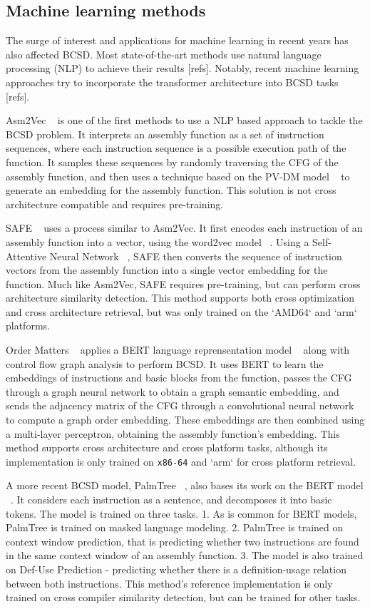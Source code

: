 \documentclass[conference,compsoc]{IEEEtran}
\begin{document}
\subsection{Machine learning methods}

The surge of interest and applications for machine learning in recent years has also affected BCSD.
Most state-of-the-art methods use natural language processing (NLP) to achieve their results [refs].
Notably, recent machine learning approaches try to incorporate the transformer architecture into BCSD tasks [refs].

Asm2Vec ~\cite{Asm2Vec} is one of the first methods to use a NLP based approach to tackle the BCSD problem. It interprets an
assembly function as a set of instruction sequences, where each instruction sequence is a possible execution path
of the function. It samples these sequences by randomly traversing the CFG of the assembly function, and then
uses a technique based on the PV-DM model ~\cite{PV-DM} to generate an embedding for the assembly function. This solution
is not cross architecture compatible and requires pre-training.

SAFE ~\cite{SAFE} uses a process similar to Asm2Vec. It first encodes each instruction of an assembly function into a vector,
using the word2vec model ~\cite{word2vec}. Using a Self-Attentive Neural Network ~\cite{SANN}, SAFE then converts the sequence of instruction
vectors from the assembly function into a single vector embedding for the function. Much like Asm2Vec, SAFE requires
pre-training, but can perform cross architecture similarity detection. This method supports both cross optimization
and cross architecture retrieval, but was only trained on the `AMD64` and `arm` platforms.

Order Matters ~\cite{OrderMatters} applies a BERT language reprensentation model ~\cite{BERT} along with control flow graph analysis
to perform BCSD. It uses BERT to learn the embeddings of instructions and basic blocks from the function,
passes the CFG through a graph neural network to obtain a graph semantic embedding, and sends the adjacency
matrix of the CFG through a convolutional neural network to compute a graph order embedding. These embeddings
are then combined using a multi-layer perceptron, obtaining the assembly function's embedding. This method
supports cross architecture and cross platform tasks, although its implementation is only trained on \texttt{x86-64}
and `arm` for cross platform retrieval.

A more recent BCSD model, PalmTree ~\cite{PalmTree}, also bases its work on the BERT model ~\cite{BERT}.
It considers each instruction as a sentence, and decomposes it into basic tokens. The model is trained
on three tasks. 1. As is common for BERT models, PalmTree is trained on masked language modeling. 2.
PalmTree is trained on context window prediction, that is predicting whether two instructions are found
in the same context window of an assembly function. 3. The model is also trained on Def-Use Prediction -
predicting whether there is a definition-usage relation between both instructions. This method's
reference implementation is only trained on cross compiler similarity detection, but can be trained
for other tasks.
\end{document}
